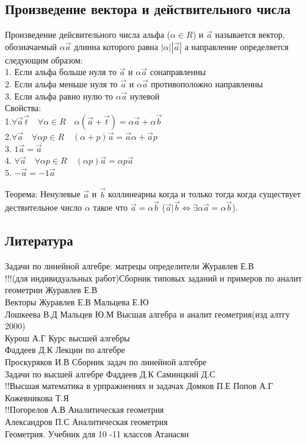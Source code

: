 \documentclass[a4paper, 12pt]{article}
\begin{document}
\subsection{Произведение вектора и действительного числа}
Произведение дейсвительного числа альфа ($ \alpha \in R $) и $ \vec{a} $ называется вектор, обозначаемый $ \alpha\vec{a} $ длинна которого равна $ |\alpha||\vec{a}| $ а направление определяется следующим образом:\\
1. Если альфа больше нуля то $ \vec{a} $ и $ \alpha\vec{a} $ сонаправленны\\
2. Если альфа меньше нуля то $ \vec{a} $ и $ \alpha\vec{a} $ противоположно направленны\\
3. Если альфа равно нулю то  $ \alpha\vec{a} $ нулевой\\
Свойства:\\
1.$\forall \vec{a}\vec{t} \quad\forall \alpha \in R \quad\alpha(\vec{a}+ \vec{t}) = \alpha \vec{a} + \alpha \vec{b}$\\
2.$  \forall \vec{a} \quad\forall \alpha p\in R  \quad(\alpha + p)\vec{a} = \vec{a} \alpha + \vec{a}p$\\
3. $  1 \vec{a} = \vec{a} $\\
4. $  \forall \vec{a} \quad\forall \alpha p \in R  \quad(\alpha p)\vec{a}= \alpha p\vec{a}$\\
5. $  -\vec{a} = -1\vec{a} $\\
\begin{framed}
Теорема: Ненулевые $ \vec{a} $ и $ \vec{b} $ коллинеарны когда и только тогда когда существует дествительное число $ \alpha $ такое что $ \vec{a} = \alpha\vec{b} $ ($\vec{a}|\vec{b} \Leftrightarrow \exists \alpha \vec{a} = \alpha\vec{b}$).
\end{framed}


\subsection*{Литература}
Задачи по линейной алгебре: матрецы определители Журавлев Е.В\\
!!!(для индивидуальных работ)Сборник типовых заданий и примеров по аналит геометрии Журавлев Е.В\\
Векторы Журавлев Е.В Мальцева Е.Ю\\
Лошкеева В.Д Мальцев Ю.М Высшая алгебра и аналит геометрия(изд алтгу 2000)\\
Курош А.Г Курс высшей алгебры\\
Фаддеев Д.К Лекции по алгебре\\
Проскуряков И.В Сборник задач по линейной алгебре\\
Задачи по высшей алгебре Фаддеев Д.К Саминцкий Д.С\\
!!Высшая математика в урпражнениях и задачах Домков П.Е Попов А.Г Кожевникова Т.Я\\
!!Погорелов А.В Аналитическая геометрия\\
Александров П.С Аналитическая геометрия\\
Геометрия. Учебник для 10 -11 классов Атанасян\\
\end{document}
